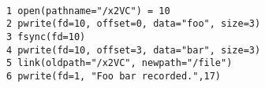 \begin{lstlisting}[float=t, caption = {\textbf{System call trace for a toy
update protocol}. {\em \small The protocol writes a file, syncs it, writes the
file again, and links it a new location. Finally it records the operation as
done on stdout.} }, label = {lst-syscall}, escapechar=!]

1 open(pathname="/x2VC") = 10
2 pwrite(fd=10, offset=0, data="foo", size=3)
3 fsync(fd=10)
4 pwrite(fd=10, offset=3, data="bar", size=3)
5 link(oldpath="/x2VC", newpath="/file")
6 pwrite(fd=1, "Foo bar recorded.",17)  

\end{lstlisting}
